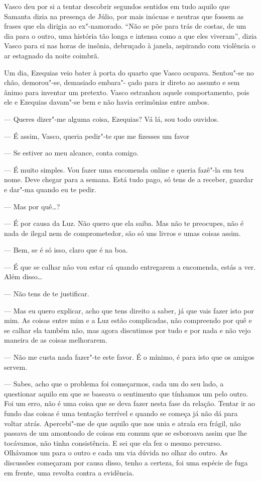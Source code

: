 Vasco deu por si a tentar descobrir segundos sentidos em tudo aquilo que
Samanta dizia na presença de Júlio, por mais inócuas e neutras que
fossem as frases que ela dirigia ao ex"-namorado. ``Não se põe para trás
de costas, de um dia para o outro, uma história tão longa e intensa como
a que eles viveram'', dizia Vasco para si nas horas de insônia, debruçado
à janela, aspirando com violência o ar estagnado da noite coimbrã.

Um dia, Ezequias veio bater à porta do quarto que Vasco
ocupava. Sentou"-se no chão, demorou"-se, demasiado embara"- çado para ir
direto ao assunto e sem ânimo para inventar um pretexto. Vasco
estranhou aquele comportamento, pois ele e Ezequias davam"-se bem e não
havia cerimônias entre ambos.

--- Queres dizer"-me alguma coisa, Ezequias? Vá lá, sou todo ouvidos.

--- É assim, Vasco, queria pedir"-te que me fizesses um favor

--- Se estiver ao meu alcance, conta comigo.

--- É muito simples. Vou fazer uma encomenda online e
queria fazê"-la em teu nome. Deve chegar para a semana. Está
tudo pago, só tens de a receber, guardar e dar"-ma quando eu
te pedir.

--- Mas por quê\ldots{}?

--- É por causa da Luz. Não quero que ela saiba. Mas não
te preocupes, não é nada de ilegal nem de comprometedor, são
só uns livros e umas coisas assim.

--- Bem, se é só isso, claro que é na boa.

--- É que se calhar não vou estar cá quando entregarem a
encomenda, estás a ver. Além disso\ldots{}

--- Não tens de te justificar.

--- Mas eu quero explicar, acho que tens direito a saber, já
que vais fazer isto por mim. As coisas entre mim e a Luz estão
complicadas, não compreendo por quê e se calhar ela também
não, mas agora discutimos por tudo e por nada e não vejo
maneira de as coisas melhorarem.

--- Não me custa nada fazer"-te este favor. É o mínimo, é
para isto que os amigos servem.

--- Sabes, acho que o problema foi começarmos, cada um
do seu lado, a questionar aquilo em que se baseava o sentimento
que tínhamos um pelo outro. Foi um erro, não é uma coisa que se
deva fazer nesta fase da relação. Tentar ir ao fundo das
coisas é uma tentação terrível e quando se começa já não dá para voltar
atrás. Apercebi"-me de que aquilo que nos unia e atraía era frágil, não
passava de um amontoado de coisas em comum que se esboroava assim que
lhe tocávamos, não tinha consistência. E sei que ela fez o mesmo
percurso. Olhávamos um para o outro e cada um via dúvida no olhar do
outro. As discussões começaram por causa disso, tenho a certeza, foi uma
espécie de fuga em frente, uma revolta contra a evidência.

